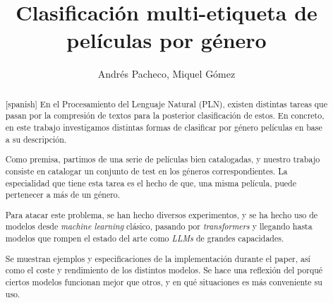 \documentclass[11pt,spanish,listoffigures,listoftables]{tfgetsinf}
\title{Clasificación multi-etiqueta de películas por género}
\author{Andrés Pacheco, Miquel Gómez}
\begin{document}
 




\begin{abstract}[spanish]
En el Procesamiento del Lenguaje Natural (PLN), existen distintas tareas que pasan por la compresión de textos para la posterior clasificación de estos. En concreto, en este trabajo investigamos distintas formas de clasificar por género películas en base a su descripción.

Como premisa, partimos de una serie de películas bien catalogadas, y nuestro trabajo consiste en catalogar un conjunto de test en los géneros correspondientes. La especialidad que tiene esta tarea es el hecho de que, una misma película, puede pertenecer a más de un género. 

Para atacar este problema, se han hecho diversos experimentos, y se ha hecho uso de modelos desde \textit{machine learning} clásico, pasando por \textit{transformers} y llegando hasta modelos que rompen el estado del arte como \textit{LLMs} de grandes capacidades.

Se muestran ejemplos y especificaciones de la implementación durante el paper, así como el coste y rendimiento de los distintos modelos. Se hace una reflexión del porqué ciertos modelos funcionan mejor que otros, y en qué situaciones es más conveniente su uso. 
\end{abstract}


\clearpage
\tableofcontents

\end{document}
